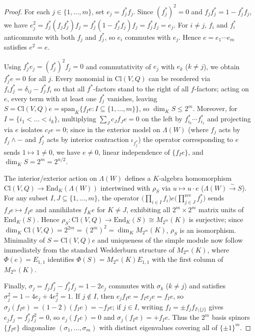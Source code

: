 \documentclass[11pt,a4paper]{article}
\theoremstyle{plain}
\theoremstyle{definition}
\theoremstyle{remark}
\newcommand{\Cl}{\mathrm{Cl}}
\newcommand{\End}{\mathrm{End}}
\newcommand{\Span}{\mathrm{span}}
\begin{document}
\begin{proof}
For each $j \in \{1,\dots,m\}$, set $e_j = f_j^* f_j$. Since $(f_j^*)^2 = 0$ and $f_j f_j^* = 1 - f_j^* f_j$, we have $e_j^2 = f_j^* (f_j f_j^*) f_j = f_j^*(1 - f_j^* f_j) f_j = f_j^* f_j = e_j$. For $i \neq j$, $f_i$ and $f_i^*$ anticommute with both $f_j$ and $f_j^*$, so $e_i$ commutes with $e_j$. Hence $e = e_1 \cdots e_m$ satisfies $e^2 = e$.

Using $f_j^* e_j = (f_j^*)^2 f_j = 0$ and commutativity of $e_j$ with $e_k$ ($k \neq j$), we obtain $f_j^* e = 0$ for all $j$. Every monomial in $\Cl(V, Q)$ can be reordered via $f_i f_j^* = \delta_{ij} - f_j^* f_i$ so that all $f^*$-factors stand to the right of all $f$-factors; acting on $e$, every term with at least one $f_j^*$ vanishes, leaving $S = \Cl(V, Q) e = \Span_K\{f_I e : I \subseteq \{1,\dots,m\}\}$, so $\dim_K S \le 2^m$. Moreover, for $I = \{i_1 < \dots < i_k\}$, multiplying $\sum_J c_J f_J e = 0$ on the left by $f_{i_k}^* \cdots f_{i_1}^*$ and projecting via $e$ isolates $c_I e = 0$; since in the exterior model on $\Lambda(W)$ (where $f_j$ acts by $f_j \wedge -$ and $f_j^*$ acts by interior contraction $\iota_{f_j^*}$) the operator corresponding to $e$ sends $1 \mapsto 1 \neq 0$, we have $e \neq 0$, linear independence of $\{f_I e\}$, and $\dim_K S = 2^m = 2^{n/2}$.

The interior/exterior action on $\Lambda(W)$ defines a $K$-algebra homomorphism $\Cl(V, Q) \to \End_K(\Lambda(W))$ intertwined with $\rho_S$ via $u \mapsto u \cdot e$ ($\Lambda(W) \xrightarrow{\sim} S$). For any subset $I, J \subseteq \{1,\dots,m\}$, the operator $\bigl(\prod_{i \in I} f_i\bigr) e \bigl(\prod_{j \in J}^{\text{rev}} f_j^*\bigr)$ sends $f_J e \mapsto f_I e$ and annihilates $f_K e$ for $K \neq J$, exhibiting all $2^m \times 2^m$ matrix units of $\End_K(S)$. Hence $\rho_S : \Cl(V, Q) \to \End_K(S) \cong M_{2^m}(K)$ is surjective; since $\dim_K \Cl(V, Q) = 2^{2m} = (2^m)^2 = \dim_K M_{2^m}(K)$, $\rho_S$ is an isomorphism. Minimality of $S = \Cl(V, Q) e$ and uniqueness of the simple module now follow immediately from the standard Wedderburn structure of $M_{2^m}(K)$, where $\Phi(e) = E_{1,1}$ identifies $\Phi(S) = M_{2^m}(K) E_{1,1}$ with the first column of $M_{2^m}(K)$.

Finally, $\sigma_j = f_j f_j^* - f_j^* f_j = 1 - 2 e_j$ commutes with $\sigma_k$ ($k \neq j$) and satisfies $\sigma_j^2 = 1 - 4e_j + 4e_j^2 = 1$. If $j \notin I$, then $e_j f_I e = f_I e_j e = f_I e$, so $\sigma_j(f_I e) = (1 - 2)(f_I e) = -f_I e$; if $j \in I$, writing $f_I = \pm f_j f_{I \setminus \{j\}}$ gives $e_j f_j = f_j^* f_j^2 = 0$, so $e_j(f_I e) = 0$ and $\sigma_j(f_I e) = +f_I e$. Thus the $2^m$ basis spinors $\{f_I e\}$ diagonalize $(\sigma_1,\dots,\sigma_m)$ with distinct eigenvalues covering all of $\{\pm 1\}^m$.
\end{proof}
\end{document}
